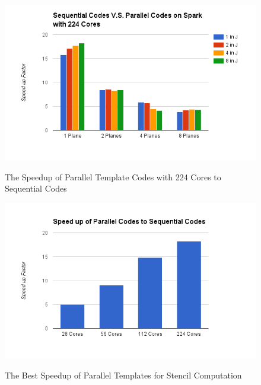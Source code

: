 \begin{figure}[h]
\centering
\includegraphics[scale=0.7]{figures/Stencil224.png}\\
\caption{The Speedup of Parallel Template Codes with 224 Cores to Sequential Codes}
\label{Stencil224}
\end{figure}

\begin{figure}[h]
\centering
\includegraphics[scale=0.7]{figures/StencilBest.png}\\
\caption{The Best Speedup of Parallel Templates for Stencil Computation}
\label{StencilBest}
\end{figure}


